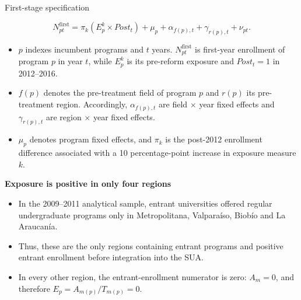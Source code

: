 \documentclass{beamer}
\begin{document}
\begin{frame}{First-stage specification}

\footnotesize

\[
N^{\mathrm{first}}_{pt}
=
\pi_k\left(E_p^k\times Post_t\right)
+\mu_p+\alpha_{f(p),t}
+\gamma_{r(p),t}+\nu_{pt}.
\]

\begin{itemize}
\setlength{\itemsep}{3pt}

\item $p$ indexes incumbent programs and $t$ years.
$N^{\mathrm{first}}_{pt}$ is first-year enrollment of program $p$ in year $t$,
while $E_p^k$ is its pre-reform exposure and $Post_t=1$ in 2012--2016.

\item $f(p)$ denotes the pre-treatment field of program $p$ and $r(p)$ its
pre-treatment region. Accordingly, $\alpha_{f(p),t}$ are field $\times$ year
fixed effects and $\gamma_{r(p),t}$ are region $\times$ year fixed effects.

\item $\mu_p$ denotes program fixed effects, and $\pi_k$ is the post-2012
enrollment difference associated with a 10 percentage-point increase in
exposure measure $k$.

\end{itemize}

\vspace{0.08cm}
\textbf{Exposure is positive in only four regions}

\begin{itemize}
\setlength{\itemsep}{3pt}

\item In the 2009--2011 analytical sample, entrant universities offered
regular undergraduate programs only in Metropolitana, Valparaíso,
Biobío and La Araucanía.

\item Thus, these are the only regions containing entrant programs and
positive entrant enrollment before integration into the SUA.

\item In every other region, the entrant-enrollment numerator is zero:
$A_m=0$, and therefore $E_p=A_{m(p)}/T_{m(p)}=0$.

\end{itemize}

\end{frame}
\end{document}
